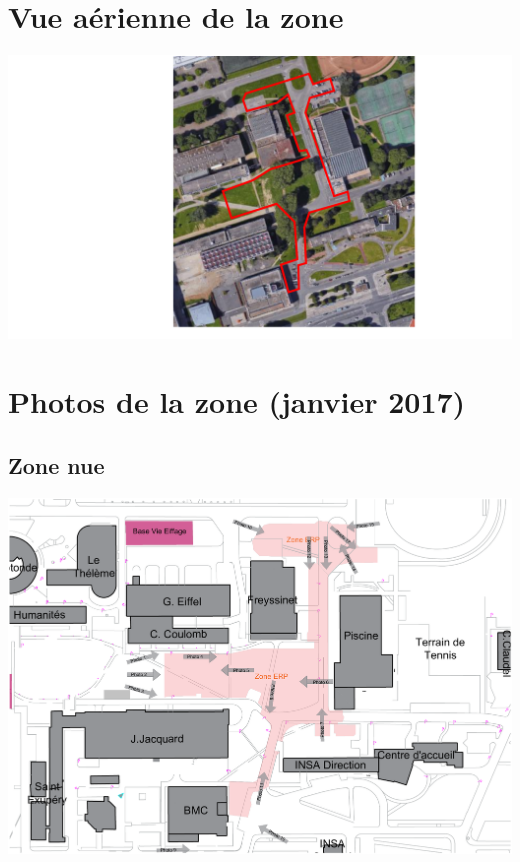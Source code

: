 \documentclass[hidelinks, paper=a4, fontsize=13pt]{report}
\begin{document}
\section{Vue aérienne de la zone}

\begin{center}
	\includegraphics[width=.8\textwidth,keepaspectratio]{Exports/ERP_vue_aerienne.pdf}
\end{center}
\newpage
\section{Photos de la zone (janvier 2017)}
\subsection{Zone nue}
\begin{center}
	\includegraphics[angle=90,width=.8\textwidth,keepaspectratio]{Exports/Plan_24h_44eme-Photos_Zone}
\end{center}
\newpage
\end{document}

